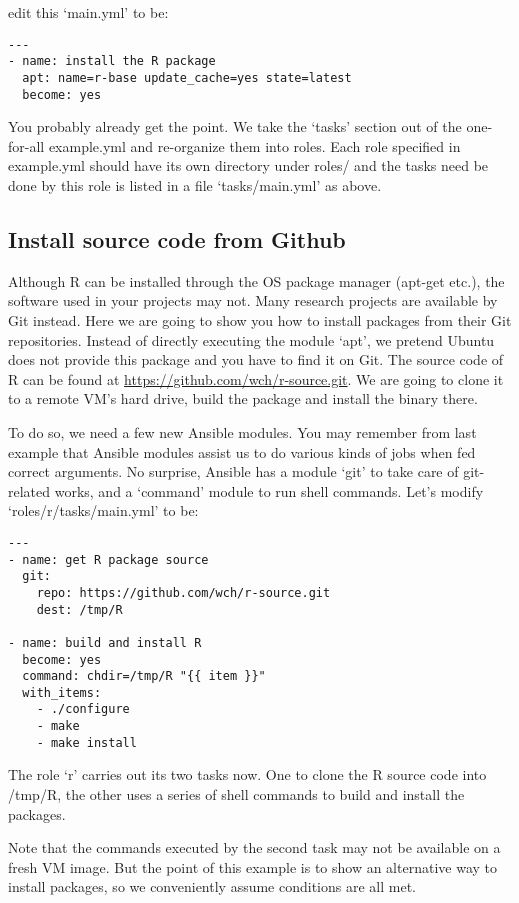 edit this `main.yml' to be:

\begin{verbatim}
---
- name: install the R package
  apt: name=r-base update_cache=yes state=latest
  become: yes
\end{verbatim}

You probably already get the point. We take the `tasks' section out of
the one-for-all example.yml and re-organize them into roles. Each role
specified in example.yml should have its own directory under roles/ and
the tasks need be done by this role is listed in a file `tasks/main.yml'
as above.

\subsection{Install source code from
Github}\label{install-source-code-from-github}

Although R can be installed through the OS package manager (apt-get
etc.), the software used in your projects may not. Many research
projects are available by Git instead. Here we are going to show you how
to install packages from their Git repositories. Instead of directly
executing the module `apt', we pretend Ubuntu does not provide this
package and you have to find it on Git. The source code of R can be
found at \url{https://github.com/wch/r-source.git}. We are going to
clone it to a remote VM's hard drive, build the package and install the
binary there.

To do so, we need a few new Ansible modules. You may remember from last
example that Ansible modules assist us to do various kinds of jobs when
fed correct arguments. No surprise, Ansible has a module `git' to take
care of git-related works, and a `command' module to run shell commands.
Let's modify `roles/r/tasks/main.yml' to be:

\begin{verbatim}
---
- name: get R package source
  git:
    repo: https://github.com/wch/r-source.git
    dest: /tmp/R

- name: build and install R
  become: yes
  command: chdir=/tmp/R "{{ item }}"
  with_items:
    - ./configure
    - make
    - make install
\end{verbatim}

The role `r' carries out its two tasks now. One to clone the R source
code into /tmp/R, the other uses a series of shell commands to build and
install the packages.

Note that the commands executed by the second task may not be available
on a fresh VM image. But the point of this example is to show an
alternative way to install packages, so we conveniently assume
conditions are all met.


